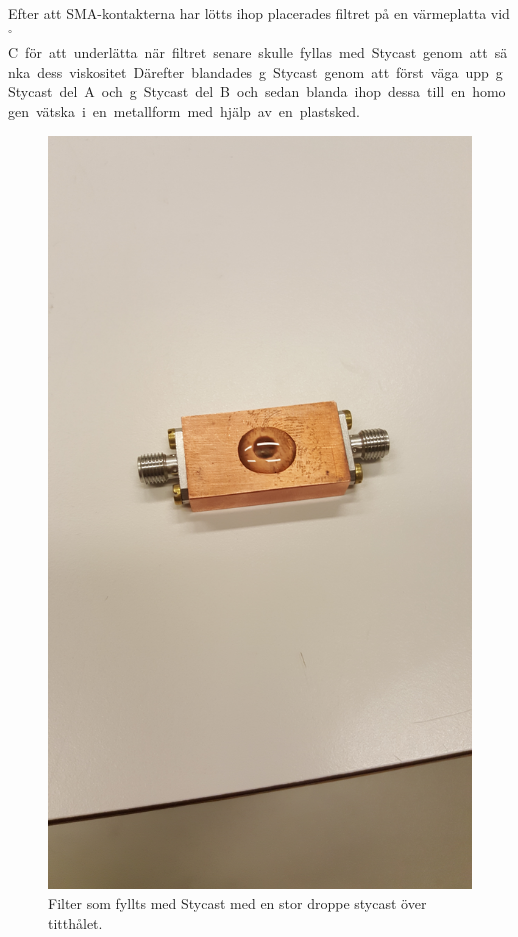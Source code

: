 \documentclass[main.tex]{subfiles}
\begin{document}
Efter att SMA-kontakterna har lötts ihop placerades filtret på en värmeplatta vid \unit[40]{$^\circ$C} för att underlätta när filtret senare skulle fyllas med Stycast genom att sänka dess viskositet. Därefter blandades \unit[12,8]{g} Stycast genom att först väga upp \unit[10]{g} Stycast del A och \unit[2,8]{g} Stycast del B och sedan blanda ihop dessa till en homogen vätska i en metallform med hjälp av en plastsked. 

\begin{figure}
    \centering
    \includegraphics[angle=-90,trim=1250 200 1950 200,clip,width=0.975\linewidth]{figure/Filterbilder/stycast_fill.jpg}
    \caption{Filter som fyllts med Stycast med en stor droppe stycast över titthålet.}
    \label{fig:stycast_filled}
\end{figure}
\end{document}

